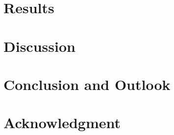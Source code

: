 \documentclass[10pt,twocolumn,romanappendices,final]{IEEEtran}
\begin{document}
%

\section{Results}
\label{sec:results}


\section{Discussion}
\label{sec:discussion}


\section{Conclusion and Outlook}
\label{sec:conclusion_outlook}


\section*{Acknowledgment}

\end{document}
